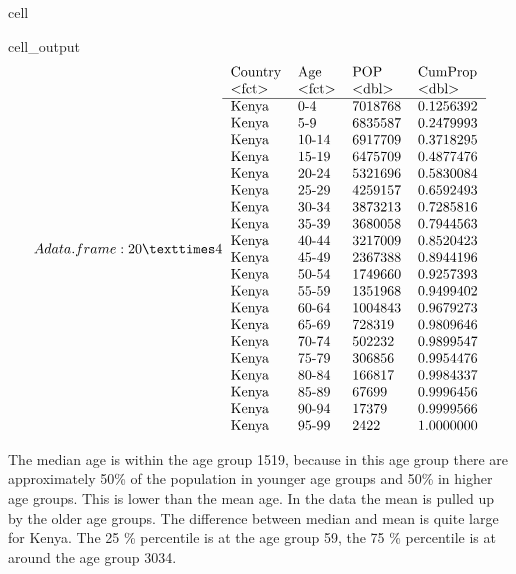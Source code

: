 \documentclass[letterpaper,10pt,english]{jupyterBook}
\begin{document}
\begin{sphinxuseclass}{cell}
\begin{sphinxVerbatimOutput}
\begin{sphinxuseclass}{cell_output}\begin{equation*}
\begin{split}A data.frame: 20 × 4
\begin{tabular}{llll}
 Country & Age & POP & CumProp\\
 <fct> & <fct> & <dbl> & <dbl>\\
\hline
	 Kenya & 0-4   & 7018768 & 0.1256392\\
	 Kenya & 5-9   & 6835587 & 0.2479993\\
	 Kenya & 10-14 & 6917709 & 0.3718295\\
	 Kenya & 15-19 & 6475709 & 0.4877476\\
	 Kenya & 20-24 & 5321696 & 0.5830084\\
	 Kenya & 25-29 & 4259157 & 0.6592493\\
	 Kenya & 30-34 & 3873213 & 0.7285816\\
	 Kenya & 35-39 & 3680058 & 0.7944563\\
	 Kenya & 40-44 & 3217009 & 0.8520423\\
	 Kenya & 45-49 & 2367388 & 0.8944196\\
	 Kenya & 50-54 & 1749660 & 0.9257393\\
	 Kenya & 55-59 & 1351968 & 0.9499402\\
	 Kenya & 60-64 & 1004843 & 0.9679273\\
	 Kenya & 65-69 &  728319 & 0.9809646\\
	 Kenya & 70-74 &  502232 & 0.9899547\\
	 Kenya & 75-79 &  306856 & 0.9954476\\
	 Kenya & 80-84 &  166817 & 0.9984337\\
	 Kenya & 85-89 &   67699 & 0.9996456\\
	 Kenya & 90-94 &   17379 & 0.9999566\\
	 Kenya & 95-99 &    2422 & 1.0000000\\
\end{tabular}\end{split}
\end{equation*}
\end{sphinxuseclass}\end{sphinxVerbatimOutput}

\end{sphinxuseclass}
\sphinxAtStartPar
The median age is within the age group 15\sphinxhyphen{}19, because in this age group there are approximately 50\% of the population in younger age groups and 50\% in higher age groups. This is lower than the mean age. In the data the mean is pulled up by the older age groups. The difference between median and mean is quite large for Kenya. The 25 \% percentile is at the age group 5\sphinxhyphen{}9, the 75 \% percentile is at around the age group 30\sphinxhyphen{}34.
\end{document}
